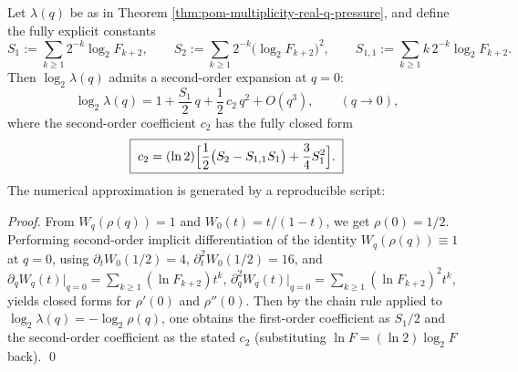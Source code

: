 \begin{proposition}[Taylor constants at the high-temperature endpoint: second-order expansion of \texorpdfstring{$\log_2\lambda(q)$}{log2 lambda(q)} at \texorpdfstring{$q=0$}{q=0}]\label{prop:pom-multiplicity-lambdaq-taylor-q0}
Let \(\lambda(q)\) be as in Theorem \ref{thm:pom-multiplicity-real-q-pressure}, and define the fully explicit constants
\[
S_1:=\sum_{k\ge 1}2^{-k}\log_2 F_{k+2},\qquad
S_2:=\sum_{k\ge 1}2^{-k}\bigl(\log_2 F_{k+2}\bigr)^2,\qquad
S_{1,1}:=\sum_{k\ge 1}k\,2^{-k}\log_2 F_{k+2}.
\]
Then \(\log_2\lambda(q)\) admits a second-order expansion at \(q=0\):
\[
\boxed{\;
\log_2\lambda(q)=1+\frac{S_1}{2}\,q+\frac12\,c_2\,q^2+O(q^3),\qquad(q\to 0),\;}
\]
where the second-order coefficient \(c_2\) has the fully closed form
\[
\boxed{\;
c_2
=(\ln 2)\Bigl[\frac12\bigl(S_2-S_{1,1}S_1\bigr)+\frac34 S_1^2\Bigr].\;}
\]
The numerical approximation is generated by a reproducible script:

\end{proposition}
\begin{proof}
From \(W_q(\rho(q))=1\) and \(W_0(t)=t/(1-t)\), we get \(\rho(0)=1/2\).
Performing second-order implicit differentiation of the identity \(W_q(\rho(q))\equiv 1\) at \(q=0\), using
\(
\partial_t W_0(1/2)=4
\),
\(
\partial_t^2 W_0(1/2)=16
\), and
\(
\partial_q W_q(t)\big|_{q=0}=\sum_{k\ge 1}(\ln F_{k+2})t^k
\),
\(
\partial_q^2 W_q(t)\big|_{q=0}=\sum_{k\ge 1}(\ln F_{k+2})^2t^k
\),
yields closed forms for \(\rho'(0)\) and \(\rho''(0)\).
Then by the chain rule applied to \(\log_2\lambda(q)=-\log_2\rho(q)\), one obtains the first-order coefficient as \(S_1/2\) and the second-order coefficient as the stated \(c_2\) (substituting \(\ln F=(\ln 2)\log_2 F\) back). \qed
\end{proof}

